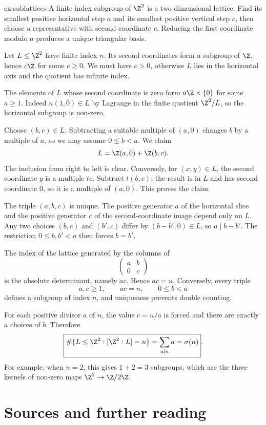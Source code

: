 \begin{solution}{ex:sublattices}
\idea A finite-index subgroup of $\Z^2$ is a two-dimensional lattice. Find its smallest positive horizontal step $a$ and its smallest positive vertical step $c$, then choose a representative with second coordinate $c$. Reducing the first coordinate modulo $a$ produces a unique triangular basis.

\writeup Let $L\le\Z^2$ have finite index $n$. Its second coordinates form a subgroup of $\Z$, hence $c\Z$ for some $c\ge0$. We must have $c>0$, otherwise $L$ lies in the horizontal axis and the quotient has infinite index.

The elements of $L$ whose second coordinate is zero form $a\Z\times\{0\}$ for some $a\ge1$. Indeed $n(1,0)\in L$ by Lagrange in the finite quotient $\Z^2/L$, so the horizontal subgroup is non-zero.

Choose $(b,c)\in L$. Subtracting a suitable multiple of $(a,0)$ changes $b$ by a multiple of $a$, so we may assume $0\le b<a$. We claim
\[
L=\Z(a,0)+\Z(b,c).
\]
The inclusion from right to left is clear. Conversely, for $(x,y)\in L$, the second coordinate $y$ is a multiple $tc$. Subtract $t(b,c)$; the result is in $L$ and has second coordinate $0$, so it is a multiple of $(a,0)$. This proves the claim.

The triple $(a,b,c)$ is unique. The positive generator $a$ of the horizontal slice and the positive generator $c$ of the second-coordinate image depend only on $L$. Any two choices $(b,c)$ and $(b',c)$ differ by $(b-b',0)\in L$, so $a\mid b-b'$. The restriction $0\le b,b'<a$ then forces $b=b'$.

The index of the lattice generated by the columns of
\[
\begin{pmatrix}a&b\\0&c\end{pmatrix}
\]
is the absolute determinant, namely $ac$. Hence $ac=n$. Conversely, every triple
\[
a,c\ge1,\qquad ac=n,\qquad0\le b<a
\]
defines a subgroup of index $n$, and uniqueness prevents double counting.

For each positive divisor $a$ of $n$, the value $c=n/a$ is forced and there are exactly $a$ choices of $b$. Therefore
\[
\boxed{\#\{L\le\Z^2:[\Z^2:L]=n\}
=\sum_{a\mid n}a=\sigma(n)}.
\]
For example, when $n=2$, this gives $1+2=3$ subgroups, which are the three kernels of non-zero maps $\Z^2\to\Z/2\Z$.
\end{solution}



\section*{Sources and further reading}

